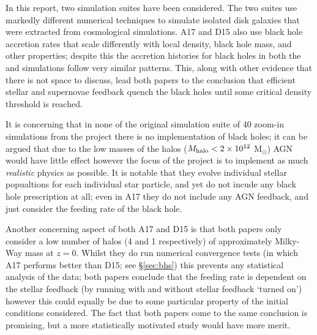 In this report, two simulation suites have been considered. The two suites use
markedly different numerical techniques to simulate isolated disk galaxies
that were extracted from cosmological simulations. A17 and D15 also use
black hole accretion rates that scale differently with local density, black
hole mass, and other properties; despite this the accretion histories for
black holes in both the \fire{} and \hagn{} simulations follow very similar
patterns. This, along with other evidence that there is not space to discuss,
lead both papers to the conclusion that efficient stellar and supernovae
feedback quench the black holes until some critical density threshold is
reached.

It is concerning that in none of the original simulation suite of 40 zoom-in
simulations from the \fire{} project there is no implementation of black holes;
it can be argued that due to the low masses of the halos ($M_{\rm halo} < 2
\times 10^{12}$ M$_\odot$) AGN would have little effect \citep[see e.g.][and
citations]{bower_breaking_2006} however the focus of the \fire{} project is to
implement as much \emph{realistic} physics as possible. It is notable that they
evolve individual stellar popualtions for each individual star particle, and
yet do not incude any black hole prescription at all; even in A17 they do not
include any AGN feedback, and just consider the feeding rate of the black hole.

Another concerning aspect of both A17 and D15 is that both papers only consider
a low number of halos (4 and 1 respectively) of approximately Milky-Way mass at
$z=0$. Whilst they do run numerical convergence tests (in which A17 performs
better than D15; see §\ref{sec:bhs}) this prevents any statistical analysis of
the data; both papers conclude that the feeding rate is dependent on the
stellar feedback (by running with and without stellar feedback `turned on')
however this could equally be due to some particular property of the initial
conditions considered. The fact that both papers come to the same conclusion is
promising, but a more statistically motivated study would have more merit.
